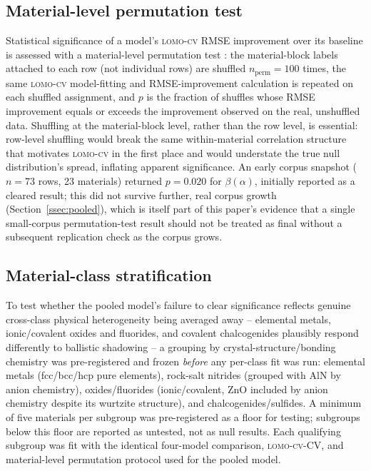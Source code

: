 \documentclass[aip,amsmath,amssymb,reprint]{revtex4-1}
\newcommand{\lomo}{\textsc{lomo-cv}}
\begin{document}
\subsection{Material-level permutation test}
\label{ssec:permutation}

Statistical significance of a model's \lomo{} RMSE improvement over
its baseline is assessed with a material-level permutation test
\citep{ojala2010permutation}: the
material-block labels attached to each row (not individual rows) are
shuffled $n_{\mathrm{perm}}=100$ times, the same \lomo{} model-fitting
and RMSE-improvement calculation is repeated on each shuffled
assignment, and $p$ is the fraction of shuffles whose RMSE improvement
equals or exceeds the improvement observed on the real, unshuffled
data. Shuffling at the material-block level, rather than the row
level, is essential: row-level shuffling would break the same
within-material correlation structure that motivates \lomo{} in the
first place and would understate the true null distribution's spread,
inflating apparent significance. An early corpus snapshot ($n=73$
rows, 23 materials) returned $p=0.020$ for $\beta(\alpha)$, initially
reported as a cleared result; this did not survive further, real
corpus growth (Section~\ref{ssec:pooled}), which is itself part of
this paper's evidence that a single small-corpus permutation-test
result should not be treated as final without a subsequent replication
check as the corpus grows.

\subsection{Material-class stratification}
\label{ssec:stratification_method}

To test whether the pooled model's failure to clear significance
reflects genuine cross-class physical heterogeneity being averaged
away -- elemental metals, ionic/covalent oxides and fluorides, and
covalent chalcogenides plausibly respond differently to ballistic
shadowing -- a grouping by crystal-structure/bonding chemistry was
pre-registered and frozen \emph{before} any per-class fit was run:
elemental metals (fcc/bcc/hcp pure elements), rock-salt nitrides
(grouped with AlN by anion chemistry), oxides/fluorides
(ionic/covalent, ZnO included by anion chemistry despite its wurtzite
structure), and chalcogenides/sulfides. A minimum of five materials
per subgroup was pre-registered as a floor for testing; subgroups
below this floor are reported as untested, not as null results. Each
qualifying subgroup was fit with the identical four-model comparison,
\lomo{}-CV, and material-level permutation protocol used for the
pooled model.
\end{document}
